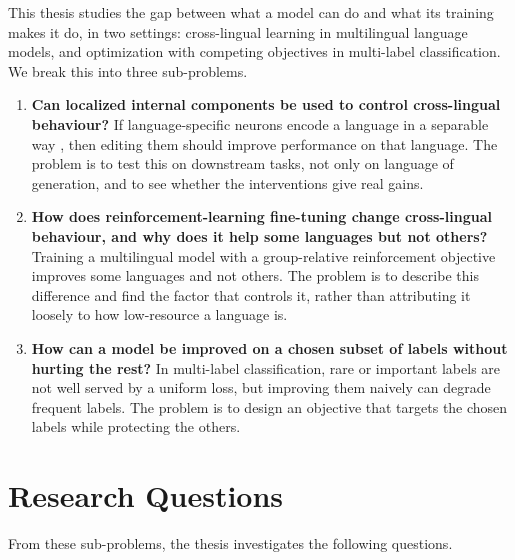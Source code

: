 This thesis studies the gap between what a model can do and what its training
makes it do, in two settings: cross-lingual learning in multilingual language
models, and optimization with competing objectives in multi-label classification.
We break this into three sub-problems.

\begin{enumerate}
	\item \textbf{Can localized internal components be used to control
		cross-lingual behaviour?} If language-specific neurons encode a language in a
	separable way \citep{tang2024language, kojima2024multilingual}, then editing
	them should improve performance on that language. The problem is to test this
	on downstream tasks, not only on language of generation, and to see whether
	the interventions give real gains.
	
	\item \textbf{How does reinforcement-learning fine-tuning change cross-lingual
		behaviour, and why does it help some languages but not others?} Training a
	multilingual model with a group-relative reinforcement objective
	\citep{shao2024deepseekmath} improves some languages and not others. The
	problem is to describe this difference and find the factor that controls it,
	rather than attributing it loosely to how low-resource a language is.
	
	\item \textbf{How can a model be improved on a chosen subset of labels without
		hurting the rest?} In multi-label classification, rare or important labels are
	not well served by a uniform loss, but improving them naively can degrade
	frequent labels. The problem is to design an objective that targets the chosen
	labels while protecting the others.
\end{enumerate}

\section{Research Questions}
\label{sec:intro-questions}

From these sub-problems, the thesis investigates the following questions.

